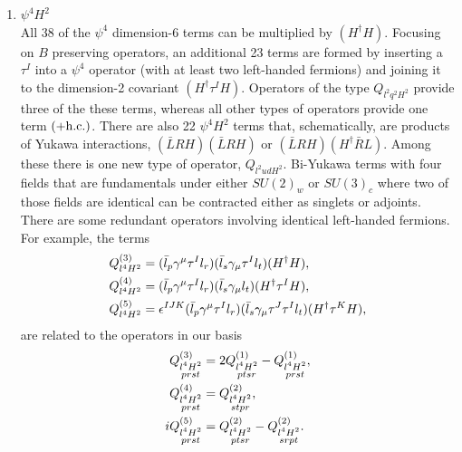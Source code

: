 \begin{enumerate}
\subsection{Four-Fermion Operators}

\item $\psi^4H^2$ \\
All 38 of the $\psi^4$ dimension-6 terms can be multiplied by $(H^{\dag} H)$.
Focusing on $B$ preserving operators, an additional 23 terms are formed by inserting a $\tau^I$ into a $\psi^4$ operator (with at least two left-handed fermions) and joining it to the dimension-2 covariant $(H^{\dag} \tau^I H)$.
Operators of the type $Q_{l^2q^2H^2}$ provide three of the these terms, whereas all other types of operators provide one term $(+ \mathrm{h.c.})$. 
There are also 22 $\psi^4H^2$ terms that, schematically, are products of Yukawa interactions, $(\bar L R H) (\bar L R H)$ or $(\bar L R H) (H^\dag \bar R L)$.
Among these there is one new type of operator, $Q_{l^2udH^2}$.
Bi-Yukawa terms with four fields that are fundamentals under either $SU(2)_w$ or $SU(3)_c$ where two of those fields are identical can be contracted either as singlets or adjoints.
There are some redundant operators involving identical left-handed fermions.
For example, the terms
\begin{align}
\label{eq:4lredun}
Q_{l^4H^2}^{(3)} &= (\bar l_p \gamma^\mu \tau^I l_r) (\bar l_s \gamma_\mu \tau^I l_t) (H^\dag H) , \nonumber\\ 
Q_{l^4H^2}^{(4)} &= (\bar l_p \gamma^\mu \tau^I l_r) (\bar l_s \gamma_\mu l_t) (H^\dag \tau^I H) , \nonumber\\ 
Q_{l^4H^2}^{(5)} &= \epsilon^{IJK} (\bar l_p \gamma^\mu \tau^I l_r) (\bar l_s \gamma_\mu \tau^J \tau^I l_t) (H^\dag \tau^K H) ,
\end{align}
are related to the operators in our basis 
\begin{align}
\label{eq:l5}
Q_{\substack{l^4H^2 \\ prst}}^{(3)} &= 2 Q_{\substack{l^4H^2 \\ ptsr}}^{(1)} - Q_{\substack{l^4H^2 \\ prst}}^{(1)} , \nn
Q_{\substack{l^4H^2 \\ prst}}^{(4)} &= Q_{\substack{l^4H^2 \\ stpr}}^{(2)}, \nn
i Q_{\substack{l^4H^2 \\ prst}}^{(5)} &= Q_{\substack{l^4H^2 \\ ptsr}}^{(2)} - Q_{\substack{l^4H^2 \\ srpt}}^{(2)} .

\end{align}
\end{enumerate}
